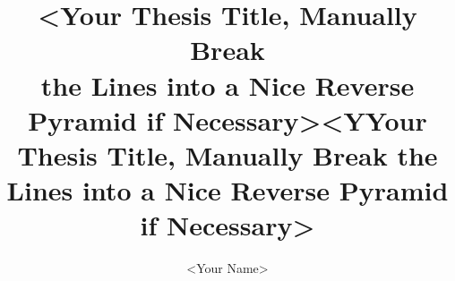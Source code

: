 \documentclass[english,nohyphen]{../../packages/GayaUKM}
\title{<Your Thesis Title, Manually Break\protect\\the Lines into a Nice Reverse\protect\\Pyramid if Necessary>}
\author{<Your Name>}  %
\begin{document}
\makecoverpage

\title{<YYour Thesis Title, Manually Break the Lines into a Nice Reverse Pyramid if Necessary>}
\maketitlepage


\frontmatter
\declaration








\tableofcontents
\listoffigures
\listoftables




\mainmatter








\appendix


\end{document}
